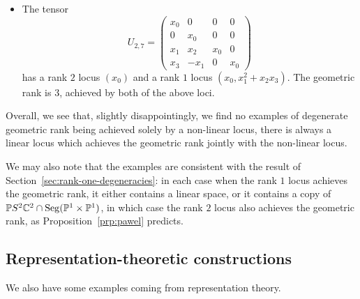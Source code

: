 \documentclass[a4paper,10pt]{article}
\def\mtrx#1{\begin{pmatrix}#1\end{pmatrix}}
\DeclareMathOperator{\Seg}{Seg}
\theoremstyle{definition}
\theoremstyle{remark}
\begin{document}
\begin{itemize}
    \item The tensor
    \[
        U_{2,7} = \mtrx{
            x_0 & 0 & 0 & 0 \\
            0 & x_0 & 0  & 0 \\
            x_1 & x_2 & x_0 & 0 \\
            x_3 & -x_1 & 0 & x_0
        }
    \]
    has a rank $2$ locus $(x_0)$ and a rank $1$ locus $(x_0, x_1^2+x_2x_3)$. The geometric rank is $3$, achieved by both of the above loci.
\end{itemize}
Overall, we see that, slightly disappointingly, we find no examples of degenerate geometric rank being achieved solely by a non-linear locus, there is always a linear locus which achieves the geometric rank jointly with the non-linear locus.

We may also note that the examples are consistent with the result of Section~\ref{sec:rank-one-degeneracies}: in each case when the rank $1$ locus achieves the geometric rank, it either contains a linear space, or it contains a copy of $\pe S^2\ce^2 \cap \Seg(\pe^1\times\pe^1)$, in which case the rank $2$ locus also achieves the geometric rank, as Proposition~\ref{prp:pawel} predicts.



\subsection{Representation-theoretic constructions}

We also have some examples coming from representation theory.
\end{document}
